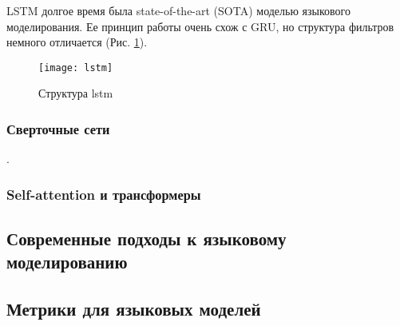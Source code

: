 LSTM долгое время была state-of-the-art (SOTA) моделью языкового моделирования. Ее принцип работы очень схож с GRU, но структура фильтров немного отличается (Рис. \ref{fig:lstm}).

\begin{figure}[ht]
	\centering
	\texttt{[image: lstm]}  
	\caption{ Структура lstm }
	\label{fig:lstm}
\end{figure}


\subsubsection{Сверточные сети}.  

\subsubsection{Self-attention и трансформеры}

\subsection{Современные подходы к языковому моделированию}
\label{sub:domain:curr}

\subsection{Метрики для языковых моделей}



